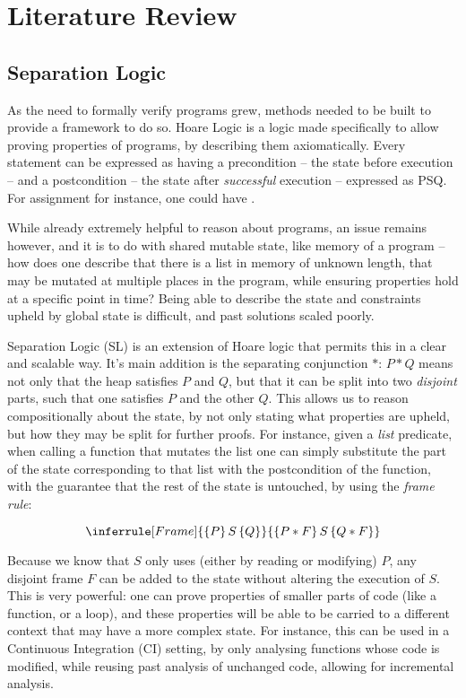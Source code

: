 \chapter{Literature Review}

\section{Separation Logic}

As the need to formally verify programs grew, methods needed to be built to provide a framework to do so. Hoare Logic \cite{hoarelogic} is a logic made specifically to allow proving properties of programs, by describing them axiomatically. Every statement can be expressed as having a precondition -- the state before execution -- and a postcondition -- the state after \emph{successful} execution -- expressed as \SLtriple PSQ. For assignment for instance, one could have .

While already extremely helpful to reason about programs, an issue remains however, and it is to do with shared mutable state, like memory of a program -- how does one describe that there is a list in memory of unknown length, that may be mutated at multiple places in the program, while ensuring properties hold at a specific point in time? Being able to describe the state and constraints upheld by global state is difficult, and past solutions scaled poorly.

Separation Logic (SL) \cite{seplogic1, seplogic2} is an extension of Hoare logic that permits this in a clear and scalable way. It's main addition is the separating conjunction $*$: $P * Q$ means not only that the heap satisfies $P$ and $Q$, but that it can be split into two \emph{disjoint} parts, such that one satisfies $P$ and the other $Q$. This allows us to reason compositionally about the state, by not only stating what properties are upheld, but how they may be split for further proofs. For instance, given a \emph{list} predicate, when calling a function that mutates the list one can simply substitute the part of the state corresponding to that list with the postcondition of the function, with the guarantee that the rest of the state is untouched, by using the \emph{frame rule}:

\[
\inferrule[Frame]
	{\SLtriple{P}{S}{Q}}
	{\SLtriple{P*F}{S}{Q*F}}
\]

Because we know that $S$ only uses (either by reading or modifying) $P$, any disjoint frame $F$ can be added to the state without altering the execution of $S$. This is very powerful: one can prove properties of smaller parts of code (like a function, or a loop), and these properties will be able to be carried to a different context that may have a more complex state. For instance, this can be used in a Continuous Integration (CI) setting, by only analysing functions whose code is modified, while reusing past analysis of unchanged code, allowing for incremental analysis.

